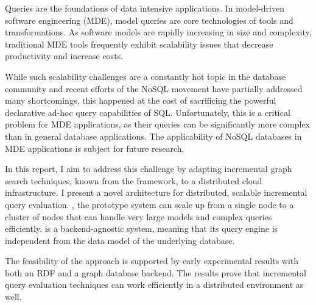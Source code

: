 Queries are the foundations of data intensive applications. In model-driven software engineering (MDE), model queries are core technologies of tools and transformations. As software models are rapidly increasing in size and complexity, traditional MDE tools frequently exhibit scalability issues that decrease productivity and increase costs.

While such scalability challenges are a constantly hot topic in the database community and recent efforts of the NoSQL movement have partially addressed many shortcomings, this happened at the cost of sacrificing the powerful declarative ad-hoc query capabilities of SQL. Unfortunately, this is a critical problem for MDE applications, as their queries can be significantly more complex than in general database applications. The applicability of NoSQL databases in MDE applications is subject for future research.

In this report, I aim to address this challenge by adapting incremental graph search techniques, known from the \eiq{} framework, to a distributed cloud infrastructure. I present a novel architecture for distributed, scalable incremental query evaluation. \iqd{}, the prototype system can scale up from a single node to a cluster of nodes that can handle very large models and complex queries efficiently. \iqd{} is a backend-agnostic system, meaning that its query engine is independent from the data model of the underlying database.

The feasibility of the approach is supported by early experimental results with both an RDF and a graph database backend. The results prove that incremental query evaluation techniques can work efficiently in a distributed environment as well.
 
\vfill

